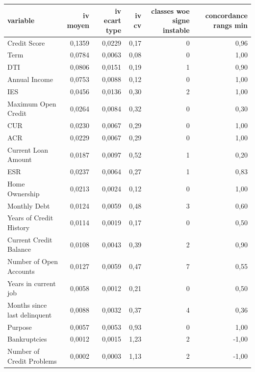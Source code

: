 \begin{tabular}{lrrrrr}
\toprule
\textbf{variable} & \textbf{iv moyen} & \textbf{iv ecart type} & \textbf{iv cv} & \textbf{classes woe signe instable} & \textbf{concordance rangs min} \\
\midrule
Credit Score & 0,1359 & 0,0229 & 0,17 & 0 & 0,96 \\
Term & 0,0784 & 0,0063 & 0,08 & 0 & 1,00 \\
DTI & 0,0806 & 0,0151 & 0,19 & 1 & 0,90 \\
Annual Income & 0,0753 & 0,0088 & 0,12 & 0 & 1,00 \\
IES & 0,0456 & 0,0136 & 0,30 & 2 & 1,00 \\
Maximum Open Credit & 0,0264 & 0,0084 & 0,32 & 0 & 0,30 \\
CUR & 0,0230 & 0,0067 & 0,29 & 0 & 1,00 \\
ACR & 0,0229 & 0,0067 & 0,29 & 0 & 1,00 \\
Current Loan Amount & 0,0187 & 0,0097 & 0,52 & 1 & 0,20 \\
ESR & 0,0237 & 0,0064 & 0,27 & 1 & 0,83 \\
Home Ownership & 0,0213 & 0,0024 & 0,12 & 0 & 1,00 \\
Monthly Debt & 0,0124 & 0,0059 & 0,48 & 3 & 0,60 \\
Years of Credit History & 0,0114 & 0,0019 & 0,17 & 0 & 0,50 \\
Current Credit Balance & 0,0108 & 0,0043 & 0,39 & 2 & 0,90 \\
Number of Open Accounts & 0,0127 & 0,0059 & 0,47 & 7 & 0,55 \\
Years in current job & 0,0058 & 0,0012 & 0,21 & 0 & 0,50 \\
Months since last delinquent & 0,0088 & 0,0032 & 0,37 & 4 & 0,36 \\
Purpose & 0,0057 & 0,0053 & 0,93 & 0 & 1,00 \\
Bankruptcies & 0,0012 & 0,0015 & 1,23 & 2 & -1,00 \\
Number of Credit Problems & 0,0002 & 0,0003 & 1,13 & 2 & -1,00 \\
\bottomrule
\end{tabular}

